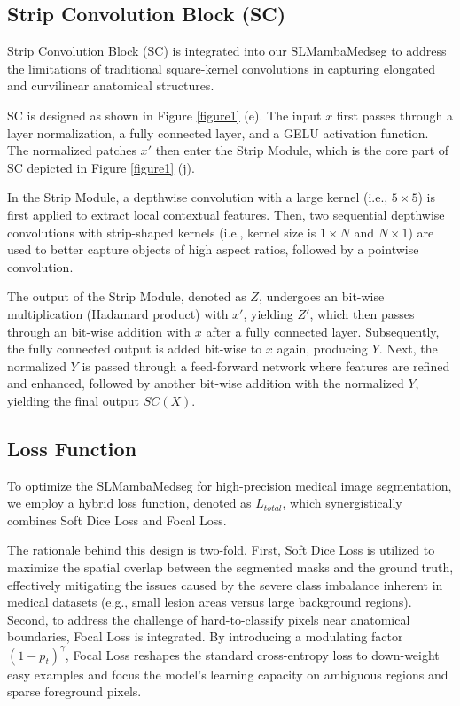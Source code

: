 \documentclass[letterpaper, 10 pt, conference]{ieeeconf}  %
\begin{document}
\subsection{Strip Convolution Block (SC)}

Strip Convolution Block (SC)\cite{hou2020strip,liu2023slak,chu2021active} is integrated into our SLMambaMedseg to address the limitations of traditional square-kernel convolutions in capturing elongated and curvilinear anatomical structures.

SC is designed as shown in Figure \textcolor{red}{\ref{figure1}} (e). The input $x$ first passes through a layer normalization, a fully connected layer, and a GELU activation function. The normalized patches $x'$ then enter the Strip Module, which is the core part of SC depicted in Figure \textcolor{red}{\ref{figure1}} (j).

In the Strip Module, a depthwise convolution with a large kernel (i.e., $5 \times 5$) is first applied to extract local contextual features. Then, two sequential depthwise convolutions with strip-shaped kernels (i.e., kernel size is $1 \times N$ and $N \times 1$) are used to better capture objects of high aspect ratios, followed by a pointwise convolution.

The output of the Strip Module, denoted as $Z$, undergoes an bit-wise multiplication (Hadamard product) with $x'$, yielding $Z'$, which then passes through an bit-wise addition with $x$ after a fully connected layer. Subsequently, the fully connected output is added bit-wise to $x$ again, producing $Y$. Next, the normalized $Y$ is passed through a feed-forward network where features are refined and enhanced, followed by another bit-wise addition with the normalized $Y$, yielding the final output $SC(X)$.


\subsection{Loss Function}

To optimize the SLMambaMedseg for high-precision medical image segmentation, we employ a hybrid loss function, denoted as $L_{total}$, which synergistically combines Soft Dice Loss and Focal Loss.

The rationale behind this design is two-fold. First, Soft Dice Loss is utilized to maximize the spatial overlap between the segmented masks and the ground truth, effectively mitigating the issues caused by the severe class imbalance inherent in medical datasets (e.g., small lesion areas versus large background regions). Second, to address the challenge of hard-to-classify pixels near anatomical boundaries, Focal Loss is integrated. By introducing a modulating factor $(1 - p_t)^\gamma$, Focal Loss reshapes the standard cross-entropy loss to down-weight easy examples and focus the model's learning capacity on ambiguous regions and sparse foreground pixels.
\end{document}
